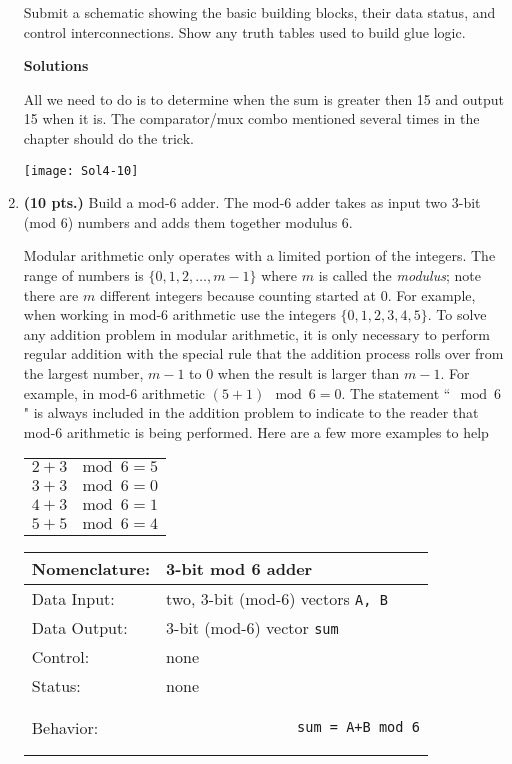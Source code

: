 \begin{enumerate}
Submit a schematic showing the basic building blocks, their
data status, and control interconnections.  Show any truth
tables used to build glue logic.

\begin{onlysolution} \textbf{Solutions} \itshape{
All we need to do is to determine when the sum is greater then
15 and output 15 when it is.  The comparator/mux combo mentioned
several times in the chapter should do the trick.

\texttt{[image: Sol4-10]}

} \end{onlysolution} 

\item \textbf{ (10 pts.)} Build a mod-6 adder.  The mod-6 adder
takes as input two 3-bit (mod 6) numbers and adds them together
modulus 6.  

\label{page:mod}
Modular arithmetic only operates with a limited portion of the
integers.  The range of numbers is $\{0,1,2, \ldots ,m-1\}$ where 
$m$ is called the \textit{ modulus}; note there are $m$ different 
integers because counting started at 0.  For example, when working
in mod-6 arithmetic use the integers $\{0,1,2,3,4,5\}$.
To solve any addition problem in modular arithmetic, it is only 
necessary to perform regular addition with the special rule that 
the addition process rolls over from the largest number, $m-1$ to 0
when the result is larger than $m-1$.  For 
example, in mod-6 arithmetic $(5+1) \mod 6 = 0$.  The statement 
``$\mod 6$" is always included in the addition problem to indicate 
to the reader that mod-6 arithmetic is being performed.  Here
are a few more examples to help

\begin{tabular}{l}
$2+3~\mod 6 = 5$ \\
$3+3~\mod 6 = 0$ \\
$4+3~\mod 6 = 1$ \\
$5+5~\mod 6 = 4$ 
\end{tabular}

\label{page:modadder}
\begin{tabular}{|l|p{3.5in}|} \hline
Nomenclature:  & 3-bit mod 6 adder                \\ \hline
Data Input:    & two, 3-bit (mod-6) vectors \verb+A, B+  \\ \hline
Data Output:   & 3-bit (mod-6) vector \verb+sum+    \\ \hline
Control:       & none                                   \\ \hline
Status:        & none                                   \\ \hline
Behavior:      & 
				\begin{verbatim}
				sum = A+B mod 6
				\end{verbatim}
		 \\ \hline
\end{tabular}


\end{enumerate}
